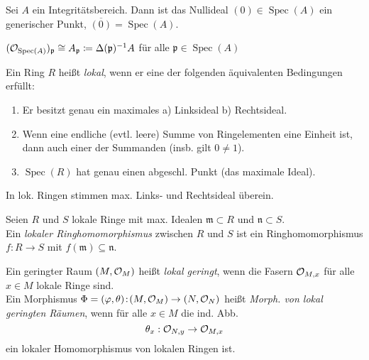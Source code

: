 \documentclass{cheat-sheet}
\DeclareMathOperator{\Spec}{Spec} %
\newcommand{\clos}[1]{\overline{#1}} %
\begin{document}
\begin{bem}
  Sei $A$ ein Integritätsbereich. Dann ist das Nullideal $(0) \in \Spec(A)$ ein generischer Punkt, \dh{} $\clos{(0)} = \Spec(A)$.
\end{bem}

\begin{lem}
  $(\O_{\Spec(A)})_{\mathfrak{p}} \cong A_{\mathfrak{p}} \coloneqq \Delta(\mathfrak{p})^{-1} A$ für alle $\mathfrak{p} \in \Spec(A)$
\end{lem}


\begin{defn}
  Ein Ring $R$ heißt \emph{lokal}, wenn er eine der folgenden äquivalenten Bedingungen erfüllt:
  \begin{enumerate}
    \item Er besitzt genau ein maximales \enspace a) Linksideal \enspace b) Rechtsideal.
    \item Wenn eine endliche (evtl. leere) Summe von Ringelementen eine Einheit ist, dann auch einer der Summanden (insb. gilt $0 \not= 1$).
    \item $\Spec(R)$ hat genau einen abgeschl. Punkt (das maximale Ideal).
  \end{enumerate}
\end{defn}

\begin{bem}
  In lok. Ringen stimmen max. Links- und Rechtsideal überein.
\end{bem}

\begin{defn}
  Seien $R$ und $S$ lokale Ringe mit max. Idealen $\mathfrak{m} \!\subset\! R$ und $\mathfrak{n} \!\subset\! S$. \\
  Ein \emph{lokaler Ringhomomorphismus} zwischen $R$ und $S$ ist ein Ringhomomorphismus $f : R \to S$ mit $f(\mathfrak{m}) \subseteq \mathfrak{n}$.
\end{defn}

\begin{defn}
  Ein geringter Raum $(M, \mathcal{O}_M)$ heißt \emph{lokal geringt}, wenn die Fasern $\mathcal{O}_{M,x}$ für alle $x \in M$ lokale Ringe sind. \\
  Ein Morphismus $\Phi = (\varphi, \theta) \!:\! (M, \mathcal{O}_M) \to (N, \mathcal{O}_N)$ heißt \emph{Morph. von lokal geringten Räumen}, wenn für alle $x \in M$ die ind. Abb.
  \[ \theta_x : \mathcal{O}_{N,y} \to \mathcal{O}_{M,x} \]
  ein lokaler Homomorphismus von lokalen Ringen ist.
\end{defn}
\end{document}
